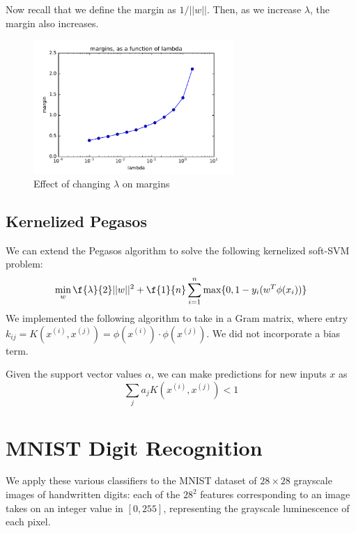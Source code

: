 \documentclass{article}
\begin{document}
\begin{multicols}{2}
Now recall that we define the margin as $1/||w||$. Then, as we increase $\lambda$, the margin also increases.

\begin{figure}[h]
   \centering
	\includegraphics[width=3in]{img/3-2-margins.pdf}
   \caption{Effect of changing $\lambda$ on margins}
   \label{fig:3-2-margins}
\end{figure}

\subsection{Kernelized Pegasos}

We can extend the Pegasos algorithm
to solve the following kernelized soft-SVM problem:
\begin{equation}
   \min_w{\f{\lambda}{2}||w||^2} + \f{1}{n}\sum_{i=1}^n{\max\{0,1-y_i(w^T\phi(x_i))\}}
\end{equation}
We implemented the following algorithm to take in a Gram matrix, where entry $k_{ij} = K(x^{(i)},x^{(j)}) = \phi(x^{(i)})\cdot\phi(x^{(j)})$.
We did not incorporate a bias term.


Given the support vector values $\alpha$, we can make predictions for new inputs $x$ as 
\begin{equation}
    \sum_j{a_j K(x^{(i)},x^{(j)}) < 1 }
\end{equation}


\section{MNIST Digit Recognition}

We apply these various classifiers to the MNIST dataset
of $28\times 28$ grayscale images of handwritten digits:
each of the $28^2$ features corresponding to an image takes on an integer value in $[0, 255]$,
representing the grayscale luminescence of each pixel.


\end{multicols}
\end{document}
